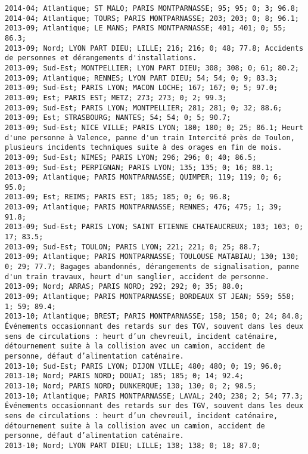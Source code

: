 \documentclass{article}
\begin{document}
\begin{Verbatim}[commandchars=\\\{\}]
2014-04; Atlantique; ST MALO; PARIS MONTPARNASSE; 95; 95; 0; 3; 96.8; 
2014-04; Atlantique; TOURS; PARIS MONTPARNASSE; 203; 203; 0; 8; 96.1; 
2013-09; Atlantique; LE MANS; PARIS MONTPARNASSE; 401; 401; 0; 55; 86.3; 
2013-09; Nord; LYON PART DIEU; LILLE; 216; 216; 0; 48; 77.8; Accidents de personnes et dérangements d'installations.
2013-09; Sud-Est; MONTPELLIER; LYON PART DIEU; 308; 308; 0; 61; 80.2; 
2013-09; Atlantique; RENNES; LYON PART DIEU; 54; 54; 0; 9; 83.3; 
2013-09; Sud-Est; PARIS LYON; MACON LOCHE; 167; 167; 0; 5; 97.0; 
2013-09; Est; PARIS EST; METZ; 273; 273; 0; 2; 99.3; 
2013-09; Sud-Est; PARIS LYON; MONTPELLIER; 281; 281; 0; 32; 88.6; 
2013-09; Est; STRASBOURG; NANTES; 54; 54; 0; 5; 90.7; 
2013-09; Sud-Est; NICE VILLE; PARIS LYON; 180; 180; 0; 25; 86.1; Heurt d'une personne à Valence, panne d'un train Intercité près de Toulon, plusieurs incidents techniques suite à des orages en fin de mois.
2013-09; Sud-Est; NIMES; PARIS LYON; 296; 296; 0; 40; 86.5; 
2013-09; Sud-Est; PERPIGNAN; PARIS LYON; 135; 135; 0; 16; 88.1; 
2013-09; Atlantique; PARIS MONTPARNASSE; QUIMPER; 119; 119; 0; 6; 95.0; 
2013-09; Est; REIMS; PARIS EST; 185; 185; 0; 6; 96.8; 
2013-09; Atlantique; PARIS MONTPARNASSE; RENNES; 476; 475; 1; 39; 91.8; 
2013-09; Sud-Est; PARIS LYON; SAINT ETIENNE CHATEAUCREUX; 103; 103; 0; 17; 83.5; 
2013-09; Sud-Est; TOULON; PARIS LYON; 221; 221; 0; 25; 88.7; 
2013-09; Atlantique; PARIS MONTPARNASSE; TOULOUSE MATABIAU; 130; 130; 0; 29; 77.7; Bagages abandonnés, dérangements de signalisation, panne d'un train travaux, heurt d'un sanglier, accident de personne.
2013-09; Nord; ARRAS; PARIS NORD; 292; 292; 0; 35; 88.0; 
2013-09; Atlantique; PARIS MONTPARNASSE; BORDEAUX ST JEAN; 559; 558; 1; 59; 89.4; 
2013-10; Atlantique; BREST; PARIS MONTPARNASSE; 158; 158; 0; 24; 84.8; Événements occasionnant des retards sur des TGV, souvent dans les deux sens de circulations : heurt d’un chevreuil, incident caténaire, détournement suite à la collision avec un camion, accident de personne, défaut d’alimentation caténaire.
2013-10; Sud-Est; PARIS LYON; DIJON VILLE; 480; 480; 0; 19; 96.0; 
2013-10; Nord; PARIS NORD; DOUAI; 185; 185; 0; 14; 92.4; 
2013-10; Nord; PARIS NORD; DUNKERQUE; 130; 130; 0; 2; 98.5; 
2013-10; Atlantique; PARIS MONTPARNASSE; LAVAL; 240; 238; 2; 54; 77.3; Événements occasionnant des retards sur des TGV, souvent dans les deux sens de circulations : heurt d’un chevreuil, incident caténaire, détournement suite à la collision avec un camion, accident de personne, défaut d’alimentation caténaire.
2013-10; Nord; LYON PART DIEU; LILLE; 138; 138; 0; 18; 87.0; 

\end{Verbatim}
\end{document}
